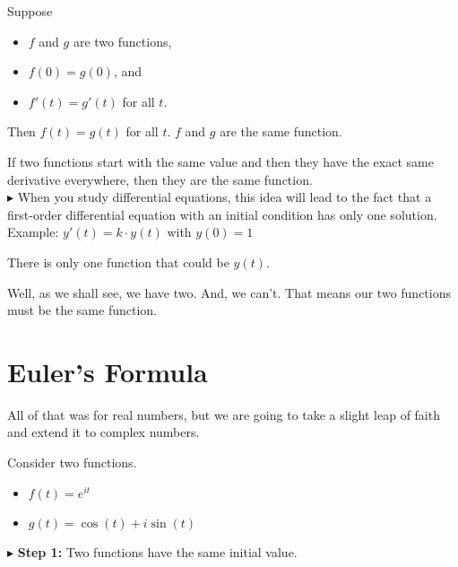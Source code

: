 \documentclass{ximera}
\begin{document}
Suppose 

\begin{itemize}
\item $f$ and $g$ are two functions,
\item $f(0) = g(0)$, and
\item $f'(t) = g'(t)$  for all $t$.
\end{itemize}

Then $f(t)=g(t)$ for all $t$.   $f$ and $g$ are the same function.



If two functions start with the same value and then they have the exact same derivative everywhere, then they are the same function. \\









$\blacktriangleright$  When you study differential equations, this idea will lead to the fact that a first-order differential equation with an initial condition has only one solution. \\

Example: $y'(t) = k \cdot y(t)$ with $y(0)=1$


There is only one function that could be $y(t)$.

Well, as we shall see, we have two.  And, we can't.  That means our two functions must be the same function. \\








\section{Euler's Formula}

All of that was for real numbers, but we are going to take a slight leap of faith and extend it to complex numbers.




Consider two functions.


\begin{itemize}
	\item $f(t) = e^{i t}$
	\item $g(t) = \cos(t) + i \sin(t)$
\end{itemize}




$\blacktriangleright$   \textbf{Step 1:} Two functions have the same initial value.
\end{document}
